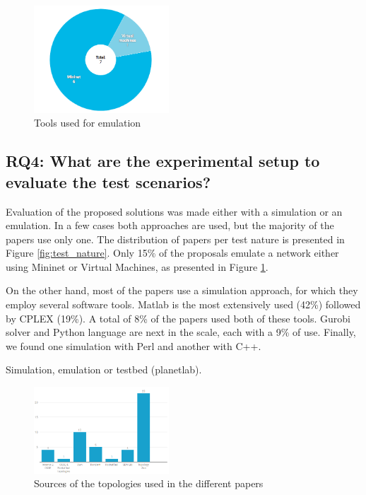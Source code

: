 \documentclass{IEEEtran}
\begin{document}
\begin{figure}
    \centering
    \includegraphics[width=0.45\textwidth]{Pictures/Emulations.png}
    \caption{Tools used for emulation}
    \label{fig:emulation}
\end{figure}



\subsection{RQ4: What are the experimental setup to evaluate the test scenarios?}

Evaluation of the proposed solutions was made either with a simulation or an emulation. In a few cases \cite{LiYo16,GoGi17,BaRo13} both approaches are used, but the majority of the papers use only one. The distribution of papers per test nature is presented in Figure \ref{fig:test_nature}. Only 15\% of the proposals emulate a network either using Mininet or Virtual Machines, as presented in Figure \ref{fig:emulation}.

On the other hand, most of the papers use a simulation approach, for which they employ several software tools. Matlab is the most extensively used (42\%) followed by CPLEX (19\%). A total of 8\% of the papers used both of these tools. Gurobi solver and Python language are next in the scale, each with a 9\% of use. Finally, we found one simulation with Perl and another with C++.

Simulation, emulation or testbed (planetlab).

\begin{figure}
    \centering
    \includegraphics[width=0.45\textwidth]{Pictures/topologysources.png}
    \caption{Sources of the topologies used in the different papers}
    \label{fig:top_source}
\end{figure}
\end{document}
